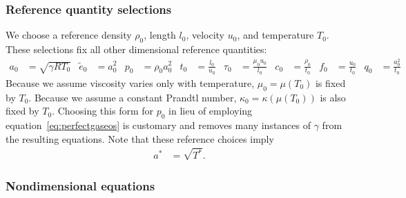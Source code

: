 \documentclass[letterpaper,11pt,nointlimits,reqno]{amsart}
\begin{document}
\subsubsection{Reference quantity selections}
\label{sec:nondimrefq}

We choose a reference density $\rho_{0}$, length $l_{0}$, velocity $u_{0}$, and
temperature $T_{0}$.  These selections fix all other dimensional reference
quantities:
\begin{align}
  a_{0} &= \sqrt{\gamma{}RT_{0}}
  &
  \tilde{e}_{0} &= a_{0}^{2}
  &
  p_{0} &= \rho_{0} a_{0}^{2}
  &
  t_{0} &= \frac{l_{0}}{u_{0}}
  &
  \tau_{0} &= \frac{\mu_{0}u_{0}}{l_{0}}
  &
  c_{0} &= \frac{\rho_{0}}{t_{0}}
  &
  f_{0} &= \frac{u_{0}}{t_{0}}
  &
  q_{0} &= \frac{a_{0}^{2}}{t_{0}}
\end{align}
Because we assume viscosity varies only with temperature, $\mu_{0}=\mu\!\left(
T_{0} \right)$ is fixed by $T_{0}$.  Because we assume a constant Prandtl
number, $\kappa_{0}=\kappa\!\left( \mu\!\left( T_{0} \right) \right)$ is also
fixed by $T_{0}$.  Choosing this form for $p_{0}$ in lieu of employing
equation~\eqref{eq:perfectgaseos} is customary and removes many instances of
$\gamma$ from the resulting equations.  Note that these reference choices imply
\begin{align}
a^{*}&=\sqrt{T^{*}}.
\end{align}

\subsubsection{Nondimensional equations}
\label{nondim_equations}
\end{document}
